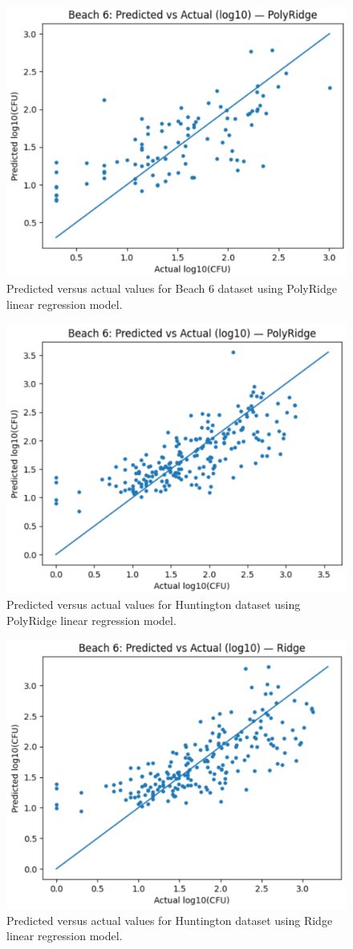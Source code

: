 \begin{figure}
    \centering
    \includegraphics[width=0.86\linewidth]{figs/b6_poly.png}
    \caption{Predicted versus actual values for Beach 6 dataset using PolyRidge linear regression model.}
    \label{fig:b6poly}
\end{figure}

\begin{figure}
    \centering
    \includegraphics[width=0.86\linewidth]{figs/hunt_poly.png}
    \caption{Predicted versus actual values for Huntington dataset using PolyRidge linear regression model.}
    \label{fig:huntPoly}
\end{figure}

\begin{figure}
    \centering
    \includegraphics[width=0.86\linewidth]{figs/hunt_ridge.png}
    \caption{Predicted versus actual values for Huntington dataset using Ridge linear regression model.}
    \label{fig:huntRidge}
\end{figure}
